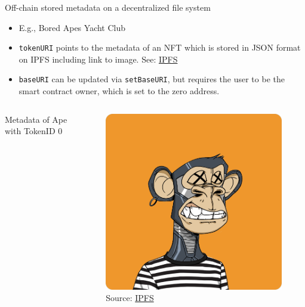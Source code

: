 \documentclass[handout]{beamer}
\begin{document}
\begin{frame}{Off-chain stored metadata on a decentralized file system}
	\begin{itemize}
		\item E.g., Bored Apes Yacht Club
		\item \texttt{tokenURI} points to the metadata of an NFT which is stored in JSON format on IPFS including link to image. See: \link \href{ipfs://QmeSjSinHpPnmXmspMjwiXyN6zS4E9zccariGR3jxcaWtq/1}{IPFS}
		\item \texttt{baseURI} can be updated via \texttt{setBaseURI}, but requires the user to be the smart contract owner, which is set to the zero address.
	\end{itemize} 
	\begin{columns}[T]
		\begin{column}{0.67\textwidth}
		\vspace{-1em}
			\begin{samplecode}{Metadata of Ape with TokenID 0}
				
			\end{samplecode}		
		\end{column} %
		\begin{column}{0.35\textwidth}
			\begin{figure}
				\vspace{-1em}
				\centering
				\includegraphics[scale=0.18]{../assets/images/ape_0.png}
				\caption*{Source: \link \href{https://bafybeibnzhc7vp4hnfcocw7s2jej2tj5xqpwseyz3ifylismh47cr45rhm.ipfs.dweb.link/}{IPFS}}	
			\end{figure}
		\end{column}
	\end{columns}
\end{frame}
\end{document}
